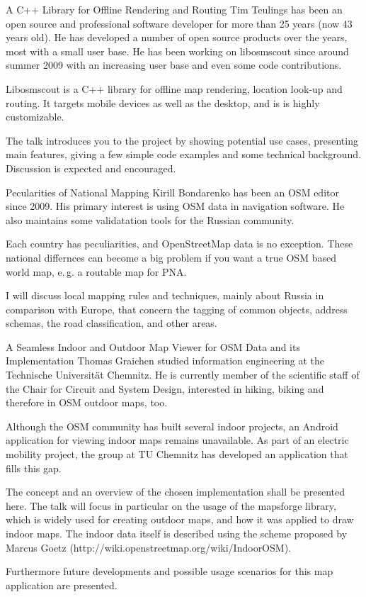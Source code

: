 %
{A C++ Library for Offline Rendering and Routing}%
{Tim Teulings has been an open source and professional software developer for more than 25 years (now 43 years old). He has developed a number of open source products over the years, most with a small user base. He has been working on libosmscout since around summer 2009 with an increasing user base and even some code contributions.}%
{Libosmscout is a C++ library for offline map rendering, location look-up and routing. It targets mobile devices as well as the desktop, and is is highly customizable.

The talk introduces you to the project by showing potential use cases, presenting main features, giving a few simple code examples and some technical background. Discussion is expected and encouraged.}


%
{Pecularities of National Mapping}%
{Kirill Bondarenko has been an OSM editor since 2009. His primary interest is using OSM data in navigation software. He also maintains some validatation tools for the Russian community.}%
{Each country has peculiarities, and OpenStreetMap data is no exception. These national differnces can become a big problem  if you want a true OSM based world map, e.\,g. a routable map for PNA.

I will discuss local mapping rules and techniques, main\-ly about Russia in comparison with Europe, that concern the tagging of common objects, address schemas, the road classification, and other areas.}


%
{A Seamless Indoor and Outdoor Map Viewer for OSM Data and its Implementation}%
{Thomas Graichen studied information engineering at the Technische Universität Chemnitz. He is currently member of the scientific staff of the Chair for Circuit and System Design, interested in hiking, biking and therefore in OSM outdoor maps, too.}%
{Although the OSM community has built several indoor projects, an Android application for viewing indoor maps remains unavailable. As part of an electric mobility pro\-ject, the group at TU Chemnitz has developed an application that fills this gap.

The concept and an overview of the chosen implementation shall be presented here. The talk will focus in particular on the usage of the mapsforge library, which is widely used for creating outdoor maps, and how it was applied to draw indoor maps. The indoor data itself is described using the scheme proposed by Marcus Goetz (http://wiki.openstreetmap.org/wiki/IndoorOSM).

Furthermore future developments and possible usage scenarios for this map application are presented.}


